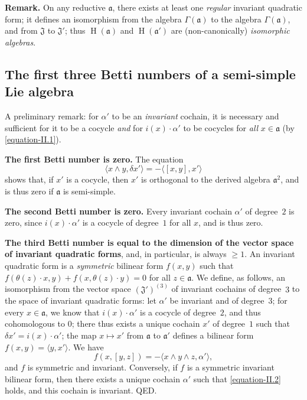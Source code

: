 \documentclass{article}
\newcommand{\fk}{\mathfrak}
\renewcommand{\geq}{\geqslant}
\DeclareMathOperator{\HH}{H}
\newcommand{\oldpage}[1]{\marginpar{\footnotesize$\Big\vert$ \textit{p.~#1}}}
\begin{document}
\medskip
\textbf{Remark.}
On any reductive $\fk{a}$, there exists at least one \emph{regular} invariant quadratic form;
it defines an isomorphism from the algebra $\Gamma(\fk{a})$ to the algebra $\Gamma(\fk{a})$, and from $\fk{J}$ to $\fk{J}'$;
thus $\HH(\fk{a})$ and $\HH(\fk{a}')$ are (non-canonically) \emph{isomorphic algebras}.


\subsection{The first three Betti numbers of a semi-simple Lie algebra}
\label{II.5}

A preliminary remark:
for $\alpha'$ to be an \emph{invariant} cochain, it is necessary and sufficient for it to be a cocycle \emph{and} for $i(x)\cdot\alpha'$ to be cocycles for \emph{all} $x\in\fk{a}$ (by \cref{equation-II.1}).

\medskip
\textbf{The first Betti number is zero.}
The equation
\[
  \langle x\wedge y,\delta x'\rangle
  = -\langle[x,y],x'\rangle
\]
shows that, if $x'$ is a cocycle, then $x'$ is orthogonal to the derived algebra $\fk{a}^2$, and is thus zero if $\fk{a}$ is semi-simple.

\medskip
\textbf{The second Betti number is zero.}
Every invariant cochain $\alpha'$ of degree~$2$ is zero, since $i(x)\cdot\alpha'$ is a cocycle of degree~$1$ for all $x$, and is thus zero.

\medskip
\textbf{The third Betti number is equal to the dimension of the vector space of invariant quadratic forms}, and, in particular, is always $\geq1$.
An invariant quadratic form is a \emph{symmetric} bilinear form $f(x,y)$ such that $f(\theta(z)\cdot x,y)+f(x,\theta(z)\cdot y)=0$ for all $z\in\fk{a}$.
We define, as follows, an isomorphism from the vector space $(\fk{J}')^{(3)}$ of invariant cochains of degree~$3$ to the space of invariant quadratic forms:
let $\alpha'$ be invariant and of degree~$3$;
for every $x\in\fk{a}$, we know that $i(x)\cdot\alpha'$ is a cocycle of degree~$2$, and thus cohomologous to $0$;
there thus exists a unique cochain $x'$ of degree~$1$ such that $\delta x'=i(x)\cdot\alpha'$;
the map $x\mapsto x'$ from $\fk{a}$ to $\fk{a}'$ defines a
\oldpage{49}
bilinear form $f(x,y)=\langle y,x'\rangle$.
We have
\[
\label{equation-II.2}
  f(x,[y,z])
  = -\langle x\wedge y\wedge z,\alpha'\rangle,
\tag{2}
\]
and $f$ is symmetric and invariant.
Conversely, if $f$ is a symmetric invariant bilinear form, then there exists a unique cochain $\alpha'$ such that \cref{equation-II.2} holds, and this cochain is invariant.
QED.
\end{document}
